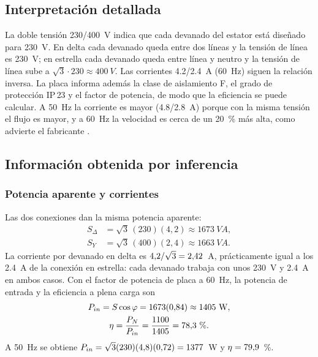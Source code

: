 \documentclass[conference]{IEEEtran}
\begin{document}
\subsection{Interpretación detallada}
La doble tensión \num{230}/\SI{400}{V} indica que cada devanado del estator está diseñado para \SI{230}{V}. En delta cada devanado queda entre dos líneas y la tensión de línea es \SI{230}{V}; en estrella cada devanado queda entre línea y neutro y la tensión de línea sube a $\sqrt3\cdot230\approx\SI{400}{V}$. Las corrientes \num{4,2}/\SI{2,4}{A} (\SI{60}{Hz}) siguen la relación inversa. La placa informa además la clase de aislamiento F, el grado de protección IP\,23 y el factor de potencia, de modo que la eficiencia se puede calcular. A \SI{50}{Hz} la corriente es mayor (\num{4,8}/\SI{2,8}{A}) porque con la misma tensión el flujo es mayor, y a \SI{60}{Hz} la velocidad es cerca de un \SI{20}{\percent} más alta, como advierte el fabricante \cite{dl1021}.

\subsection{Información obtenida por inferencia}
\subsubsection{Potencia aparente y corrientes}
Las dos conexiones dan la misma potencia aparente:
\begin{align}
S_\Delta&=\sqrt3\,(230)(4{,}2)\approx\SI{1673}{VA},\label{eq:sd}\\
S_Y&=\sqrt3\,(400)(2{,}4)\approx\SI{1663}{VA}.\label{eq:sy}
\end{align}
La corriente por devanado en delta es $4{,}2/\sqrt3=\DLIfD$~\si{A}, prácticamente igual a los \SI{2,4}{A} de la conexión en estrella: cada devanado trabaja con unos \SI{230}{V} y \SI{2,4}{A} en ambos casos. Con el factor de potencia de placa a \SI{60}{Hz}, la potencia de entrada y la eficiencia a plena carga son
\begin{gather}
P_{in}=S\cos\varphi=1673(0{,}84)\approx\DLPinSes~\si{W},\nonumber\\
\eta=\frac{P_N}{P_{in}}=\frac{1100}{\DLPinSes}=\DLetaSes~\%.
\label{eq:etafp}
\end{gather}
A \SI{50}{Hz} se obtiene $P_{in}=\sqrt3(230)(4{,}8)(0{,}72)=\DLPinCinc$~\si{W} y $\eta=\DLetaCinc$~\%.
\end{document}
